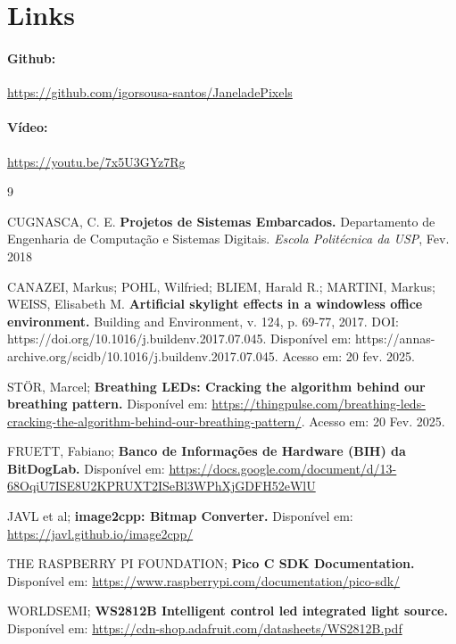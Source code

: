 \documentclass[12pt]{article}
\begin{document}
\section{Links}
\paragraph{Github:} \url{https://github.com/igorsousa-santos/JaneladePixels}
\paragraph{Vídeo:} \url{https://youtu.be/7x5U3GYz7Rg }

\pagebreak




\begin{thebibliography}{9}

    CUGNASCA, C. E.
    \textbf{Projetos de Sistemas Embarcados.} Departamento de Engenharia de Computação e Sistemas Digitais. 
    \textit{Escola Politécnica da USP}, Fev. 2018

    CANAZEI, Markus; POHL, Wilfried; BLIEM, Harald R.; MARTINI, Markus; WEISS, Elisabeth M.
    \textbf{Artificial skylight effects in a windowless office environment.} Building and Environment, v. 124, p. 69-77, 2017. DOI: https://doi.org/10.1016/j.buildenv.2017.07.045. Disponível em: https://annas-archive.org/scidb/10.1016/j.buildenv.2017.07.045. Acesso em: 20 fev. 2025.

    STÖR, Marcel;
    \textbf{Breathing LEDs: Cracking the algorithm behind our breathing pattern.}
    Disponível em: \url{https://thingpulse.com/breathing-leds-cracking-the-algorithm-behind-our-breathing-pattern/}.
    Acesso em: 20 Fev. 2025.

    FRUETT, Fabiano;
    \textbf{Banco de Informações de Hardware (BIH) da BitDogLab.}
    Disponível em: \url{https://docs.google.com/document/d/13-68OqiU7ISE8U2KPRUXT2ISeBl3WPhXjGDFH52eWlU}

    JAVL et al;
    \textbf{image2cpp: Bitmap Converter.}
    Disponível em: \url{https://javl.github.io/image2cpp/}

    THE RASPBERRY PI FOUNDATION;
    \textbf{Pico C SDK Documentation.}
    Disponível em: \url{https://www.raspberrypi.com/documentation/pico-sdk/}

    WORLDSEMI;
    \textbf{WS2812B Intelligent control led integrated light source.}
    Disponível em: \url{https://cdn-shop.adafruit.com/datasheets/WS2812B.pdf}


\end{thebibliography}
\end{document}
